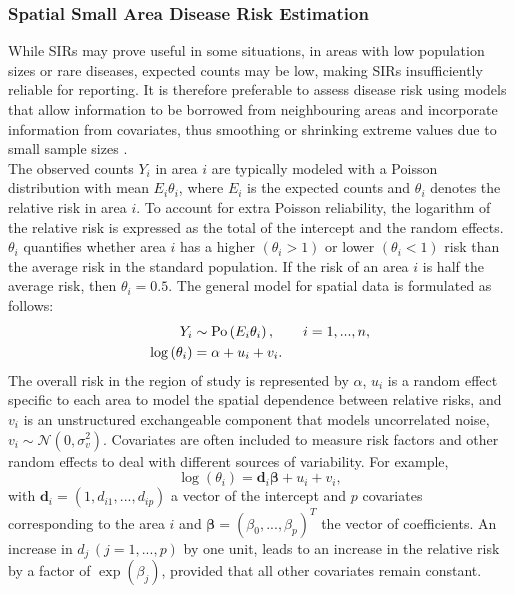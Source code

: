 \subsubsection{Spatial Small Area Disease Risk Estimation}
While SIRs may prove useful in some situations, in areas with low population sizes or rare diseases, expected counts may be low, making SIRs insufficiently reliable for reporting. It is therefore preferable to assess disease risk using models that allow information to be borrowed from neighbouring areas and incorporate information from covariates, thus smoothing or shrinking extreme values due to small sample sizes \autocite[][]{gelfand2010handbook}. \\
The observed counts $Y_i$ in area $i$ are typically modeled with a Poisson distribution with mean $E_i\theta_i$, where $E_i$ is the expected counts and $\theta_i$ denotes the relative risk in area $i$. To account for extra Poisson reliability, the logarithm of the relative risk is expressed as the total of the intercept and the random effects. $\theta_i$ quantifies whether area $i$ has a higher $\left(\theta_i >1\right)$ or lower $\left(\theta_i <1\right)$ risk than the average risk in the standard population. If the risk of an area $i$ is half the average risk, then $\theta_i = 0.5$. The general model for spatial data is formulated as follows:
\begin{align}
    Y_i&\sim\hbox{Po}\left(E_i\theta_i\right), \hspace{20pt} i=1,...,n,\\
    \log\left(\theta_i\right)&=\alpha+u_i+v_i.
\end{align}
The overall risk in the region of study is represented by $\alpha$, $u_i$ is a random effect specific to each area to model the spatial dependence between relative risks, and $v_i$ is an unstructured exchangeable component that models uncorrelated noise, $v_i\sim\mathcal{N}\left(0,\sigma_v^2\right)$. Covariates are often included to measure risk factors and other random effects to deal with different sources of variability. For example,
\begin{equation*}
    \log\left(\theta_i\right)=\pmb{d}_i\pmb{\beta}+u_i+v_i,
\end{equation*}
with $\pmb{d}_i = \left(1,d_{i1},...,d_{ip}\right)$ a vector of the intercept and $p$ covariates corresponding to the area $i$ and $\pmb{\beta}=\left(\beta_0,...,\beta_p\right)^T$ the vector of coefficients. An increase in $d_j\,\left(j = 1,...,p\right)$ by one unit, leads to an increase in the relative risk by a factor of $\exp\left(\beta_j\right)$, provided that all other covariates remain constant. \\

